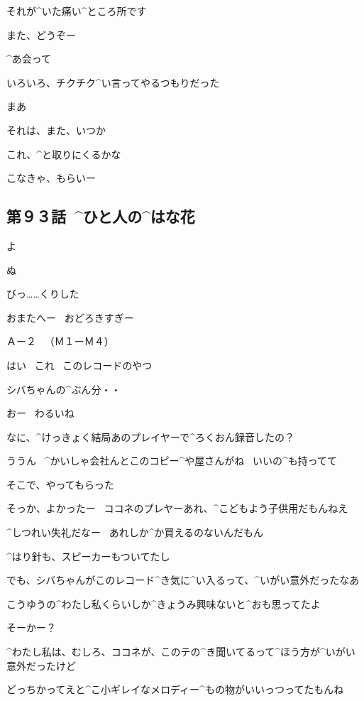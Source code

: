 \Alpha それが^{いた}{痛}い^{ところ}{所}です

\page
\Alpha また、どうぞー

\Maruko ^{あ}{会}って

\Maruko いろいろ、チクチク^{い}{言}ってやるつもりだった

\page
\Maruko まあ

\Maruko それは、また、いつか

\Alpha これ、^{と}{取}りにくるかな

\Alpha こなきゃ、もらいー


\subsection{第９３話\ ^{ひと}{人}の^{はな}{花}}

\page[73]
\Shiba よ

\Shiba ぬ

\Kokone びっ……くりした

\Shiba おまたへー
\ おどろきすぎー

\page
\Sign Ａー２
\ （Ｍ１ーＭ４）

\Kokone はい
\ これ
\ このレコードのやつ

\Kokone シバちゃんの^{ぶん}{分}・・

\Shiba おー
\ わるいね

\Shiba なに、^{けっきょく}{結局}あのプレイヤーで^{ろくおん}{録音}したの？

\Kokone ううん
\ ^{かいしゃ}{会社}んとこのコピー^{や}{屋}さんがね
\  いいの^{も}{持}ってて

\Kokone そこで、やってもらった

\Shiba そっか、よかったー
\ ココネのプレヤーあれ、^{こどもよう}{子供用}だもんねえ

\Kokone ^{しつれい}{失礼}だなー
\ あれしか^{か}{買}えるのないんだもん

\Kokone ^{はり}{針}も、スピーカーもついてたし

\page
\Kokone でも、シバちゃんがこのレコード^{き}{気}に^{い}{入}るって、^{いがい}{意外}だったなあ

\Kokone こうゆうの^{わたし}{私}くらいしか^{きょうみ}{興味}ないと^{おも}{思}ってたよ

\Shiba そーかー？

\Shiba ^{わたし}{私}は、むしろ、ココネが、このテの^{き}{聞}いてるって^{ほう}{方}が^{いがい}{意外}だったけど

\Shiba どっちかってえと^{こ}{小}ギレイなメロディー^{もの}{物}がいいっつってたもんね

